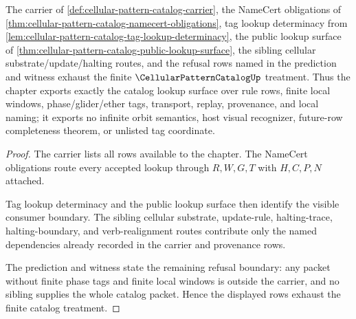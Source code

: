 \begin{theorem}
\label{thm:cellular-pattern-catalog-mature-boundary}
The carrier of \autoref{def:cellular-pattern-catalog-carrier}, the NameCert obligations of \autoref{thm:cellular-pattern-catalog-namecert-obligations}, tag lookup determinacy from \autoref{lem:cellular-pattern-catalog-tag-lookup-determinacy}, the public lookup surface of \autoref{thm:cellular-pattern-catalog-public-lookup-surface}, the sibling cellular substrate/update/halting routes, and the refusal rows named in the prediction and witness exhaust the finite $\CellularPatternCatalogUp$ treatment. Thus the chapter exports exactly the catalog lookup surface over rule rows, finite local windows, phase/glider/ether tags, transport, replay, provenance, and local naming; it exports no infinite orbit semantics, host visual recognizer, future-row completeness theorem, or unlisted tag coordinate.
\end{theorem}
\begin{proof}
The carrier lists all rows available to the chapter. The NameCert obligations route every accepted lookup through $R,W,G,T$ with $H,C,P,N$ attached.

Tag lookup determinacy and the public lookup surface then identify the visible consumer boundary. The sibling cellular substrate, update-rule, halting-trace, halting-boundary, and verb-realignment routes contribute only the named dependencies already recorded in the carrier and provenance rows.

The prediction and witness state the remaining refusal boundary: any packet without finite phase tags and finite local windows is outside the carrier, and no sibling supplies the whole catalog packet. Hence the displayed rows exhaust the finite catalog treatment.
\end{proof}


